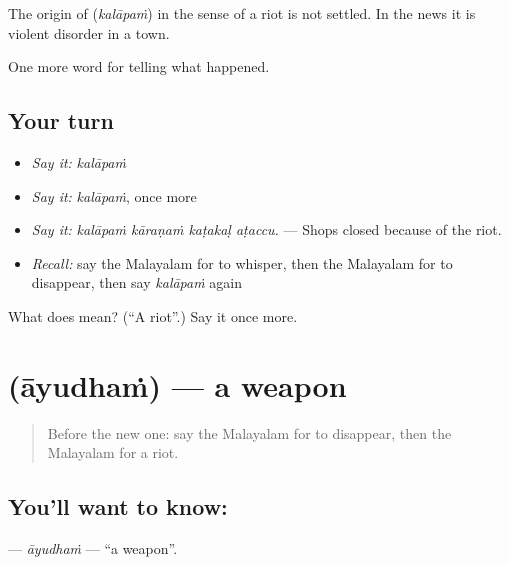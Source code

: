 \begin{cousinweb}
The origin of \textbf{} (\emph{kalāpaṁ}) in the sense of a riot is not settled. In the news it is violent disorder in a town.
\end{cousinweb}

\begin{grammarlens}[title={What you've built}]
One more word for telling what happened.
\end{grammarlens}

\subsection*{Your turn}
\begin{itemize}
\raggedright
  \item \emph{Say it:} \emph{kalāpaṁ}
  \item \emph{Say it:} \emph{kalāpaṁ}, once more
  \item \emph{Say it:} \emph{kalāpaṁ kāraṇaṁ kaṭakaḷ aṭaccu.} — Shops closed because of the riot.
  \item \emph{Recall:} say the Malayalam for to whisper, then the Malayalam for to disappear, then say \emph{kalāpaṁ} again
\end{itemize}

\begin{tcolorbox}[breakable,colback=teal!4,colframe=teal!35!black,title={Before you move on}]
What does  mean? (\textquotedblleft{}A riot\textquotedblright{}.) Say it once more.
\end{tcolorbox}
\section[\texorpdfstring{\ml{ആയുധം} (āyudhaṁ)}{ആയുധം (āyudhaṁ)}]{ (āyudhaṁ) — a weapon}

\label{lesson:ML-C382-ayudham}



\begin{quote}
Before the new one: say the Malayalam for to disappear, then the Malayalam for a riot.
\end{quote}

\subsection*{You'll want to know: }
\textbf{} — \emph{āyudhaṁ} — \textquotedblleft{}a weapon\textquotedblright{}.

